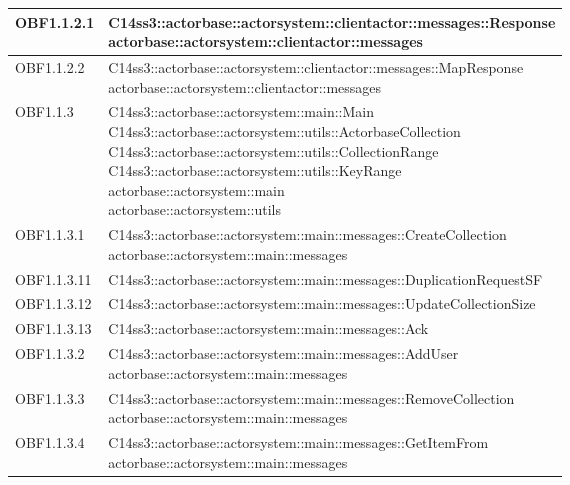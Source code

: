 \documentclass{scalatekids-article}
\begin{document}
\begin{longtable}[H]{|p{4.5cm}|p{13cm}|}
\hline
OBF1.1.2.1 & \multiLineCell[t]{C14ss3::actorbase::actorsystem::clientactor::messages::Response\\actorbase::actorsystem::clientactor::messages\\}\\
\hline
OBF1.1.2.2 & \multiLineCell[t]{C14ss3::actorbase::actorsystem::clientactor::messages::MapResponse\\actorbase::actorsystem::clientactor::messages\\}\\
\hline
OBF1.1.3 & \multiLineCell[t]{C14ss3::actorbase::actorsystem::main::Main\\C14ss3::actorbase::actorsystem::utils::ActorbaseCollection\\C14ss3::actorbase::actorsystem::utils::CollectionRange\\C14ss3::actorbase::actorsystem::utils::KeyRange\\actorbase::actorsystem::main\\actorbase::actorsystem::utils\\}\\
\hline
OBF1.1.3.1 & \multiLineCell[t]{C14ss3::actorbase::actorsystem::main::messages::CreateCollection\\actorbase::actorsystem::main::messages\\}\\
\hline
OBF1.1.3.11 & \multiLineCell[t]{C14ss3::actorbase::actorsystem::main::messages::DuplicationRequestSF\\}\\
\hline
OBF1.1.3.12 & \multiLineCell[t]{C14ss3::actorbase::actorsystem::main::messages::UpdateCollectionSize\\}\\
\hline
OBF1.1.3.13 & \multiLineCell[t]{C14ss3::actorbase::actorsystem::main::messages::Ack\\}\\
\hline
OBF1.1.3.2 & \multiLineCell[t]{C14ss3::actorbase::actorsystem::main::messages::AddUser\\actorbase::actorsystem::main::messages\\}\\
\hline
OBF1.1.3.3 & \multiLineCell[t]{C14ss3::actorbase::actorsystem::main::messages::RemoveCollection\\actorbase::actorsystem::main::messages\\}\\
\hline
OBF1.1.3.4 & \multiLineCell[t]{C14ss3::actorbase::actorsystem::main::messages::GetItemFrom\\actorbase::actorsystem::main::messages\\}\\

\end{longtable}
\end{document}
